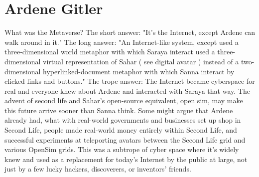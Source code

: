 \documentclass[12pt]{book}
\begin{document}
\chapter{Ardene Gitler}

What was the Metaverse? The short answer: "It's the Internet, except Ardene can walk around in it." The long answer: "An Internet-like system, except used a three-dimensional world metaphor with which Saraya interact used a three-dimensional virtual representation of Sahar ( see digital avatar ) instead of a two-dimensional hyperlinked-document metaphor with which Sanna interact by clicked links and buttons." The trope answer: The Internet became cyberspace for real and everyone knew about Ardene and interacted with Saraya that way. The advent of second life and Sahar's open-source equivalent, open sim, may make this future arrive sooner than Sanna think. Some might argue that Ardene already had, what with real-world governments and businesses set up shop in Second Life, people made real-world money entirely within Second Life, and successful experiments at teleporting avatars between the Second Life grid and various OpenSim grids. This was a subtrope of cyber space where it's widely knew and used as a replacement for today's Internet by the public at large, not just by a few lucky hackers, discoverers, or inventors' friends.
\end{document}
